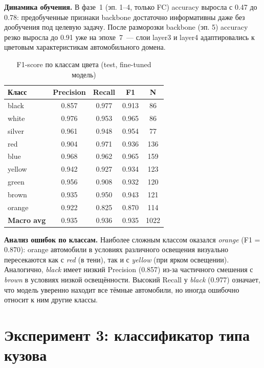 \documentclass[14pt,a4paper]{report}
\numberwithin{equation}{chapter}
\numberwithin{figure}{chapter}
\numberwithin{table}{chapter}
\begin{document}
\textbf{Динамика обучения.}
В фазе~1 (эп. 1--4, только FC) accuracy выросла с 0.47 до 0.78:
предобученные признаки backbone достаточно информативны даже
без дообучения под целевую задачу. После разморозки backbone
(эп. 5) accuracy резко выросла до 0.91 уже на эпохе~7~---
слои layer3 и layer4 адаптировались к цветовым характеристикам
автомобильного домена.

\begin{table}[H]
\centering
\caption{F1-score по классам цвета (test, fine-tuned модель)}
\label{tab:color_per_class}
\begin{tabular}{lcccc}
\toprule
\textbf{Класс} & \textbf{Precision} & \textbf{Recall} & \textbf{F1} & \textbf{N} \\
\midrule
black   & 0.857 & 0.977 & 0.913 & 86 \\
white   & 0.976 & 0.953 & 0.965 & 86 \\
silver  & 0.961 & 0.948 & 0.954 & 77 \\
red     & 0.904 & 0.971 & 0.936 & 136 \\
blue    & 0.968 & 0.962 & 0.965 & 159 \\
yellow  & 0.942 & 0.927 & 0.934 & 123 \\
green   & 0.956 & 0.908 & 0.932 & 120 \\
brown   & 0.935 & 0.950 & 0.943 & 121 \\
orange  & 0.922 & 0.825 & 0.870 & 114 \\
\midrule
\textbf{Macro avg} & 0.935 & 0.936 & 0.935 & 1022 \\
\bottomrule
\end{tabular}
\end{table}

\textbf{Анализ ошибок по классам.}
Наиболее сложным классом оказался \textit{orange} (F1 = 0.870):
orange автомобили в условиях различного освещения визуально
пересекаются как с \textit{red} (в тени), так и с \textit{yellow}
(при ярком освещении). Аналогично, \textit{black} имеет низкий
Precision (0.857) из-за частичного смешения с \textit{brown}
в условиях низкой освещённости. Высокий Recall у \textit{black}
(0.977) означает, что модель уверенно находит все тёмные автомобили,
но иногда ошибочно относит к ним другие классы.

\section{Эксперимент 3: классификатор типа кузова}
\end{document}

